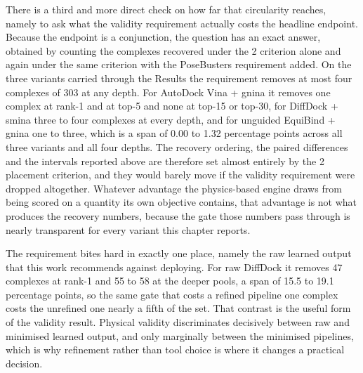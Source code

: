 There is a third and more direct check on how far that circularity reaches, namely to ask what the validity requirement actually costs the headline endpoint. Because the endpoint is a conjunction, the question has an exact answer, obtained by counting the complexes recovered under the 2 \angstrom{} criterion alone and again under the same criterion with the PoseBusters requirement added. On the three variants carried through the Results the requirement removes at most four complexes of 303 at any depth. For AutoDock Vina + gnina it removes one complex at rank-1 and at top-5 and none at top-15 or top-30, for DiffDock + smina three to four complexes at every depth, and for unguided EquiBind + gnina one to three, which is a span of 0.00 to 1.32 percentage points across all three variants and all four depths. The recovery ordering, the paired differences and the intervals reported above are therefore set almost entirely by the 2 \angstrom{} placement criterion, and they would barely move if the validity requirement were dropped altogether. Whatever advantage the physics-based engine draws from being scored on a quantity its own objective contains, that advantage is not what produces the recovery numbers, because the gate those numbers pass through is nearly transparent for every variant this chapter reports.

The requirement bites hard in exactly one place, namely the raw learned output that this work recommends against deploying. For raw DiffDock it removes 47 complexes at rank-1 and 55 to 58 at the deeper pools, a span of 15.5 to 19.1 percentage points, so the same gate that costs a refined pipeline one complex costs the unrefined one nearly a fifth of the set. That contrast is the useful form of the validity result. Physical validity discriminates decisively between raw and minimised learned output, and only marginally between the minimised pipelines, which is why refinement rather than tool choice is where it changes a practical decision.

